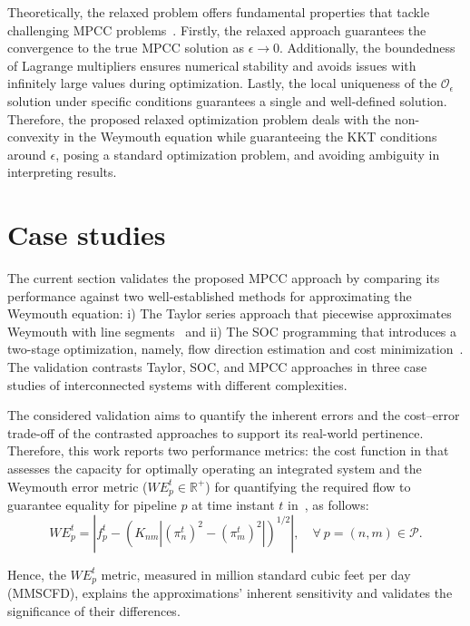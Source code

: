 Theoretically, the relaxed problem offers fundamental properties that tackle challenging MPCC problems~\citep{Ralph_Wright_2004}. Firstly, the relaxed approach guarantees the convergence to the true MPCC solution as $\epsilon\to0$. Additionally, the boundedness of Lagrange multipliers ensures numerical stability and avoids issues with infinitely large values during optimization. Lastly, the local uniqueness of the $\mathcal{O}_{\epsilon}$ solution under specific conditions guarantees a single and well-defined solution. Therefore, the proposed relaxed optimization problem deals with the non-convexity in the Weymouth equation while guaranteeing the KKT conditions around $\epsilon$, posing a standard optimization problem, and avoiding ambiguity in interpreting results.

\section{Case studies} \label{sec:case_study}
The current section validates the proposed MPCC approach by comparing its performance against two well-established methods for approximating the Weymouth equation: i) The Taylor series approach that piecewise approximates Weymouth with line segments~\cite{ORDOUDIS2019642} and ii) The SOC programming that introduces a two-stage optimization, namely, flow direction estimation and cost minimization~\cite{soc_paper}. The validation contrasts Taylor, SOC, and MPCC approaches in three case studies of interconnected systems with different complexities.

The considered validation aims to quantify the inherent errors and the cost--error trade-off of the contrasted approaches to support its real-world pertinence. Therefore, this work reports two performance metrics: the cost function in  that assesses the capacity for optimally operating an integrated system and the Weymouth error metric (${WE}_p^t\in\mathbb{R}^+$) for quantifying the required flow to guarantee equality for pipeline $p$ at time instant $t$ in~, as follows:
\begin{equation}
    {WE}_p^t = \left|f_{p}^t - \left(K_{nm}|(\pi_{n}^t)^2-(\pi_{m}^t)^2|\right)^{1/2}\right| , \quad \forall \ p =(n,m) \in\mathcal{P}.
\end{equation}

Hence, the ${WE}_p^t$ metric, measured in million standard cubic feet per day (MMSCFD), explains the approximations' inherent sensitivity and validates the significance of their differences.

